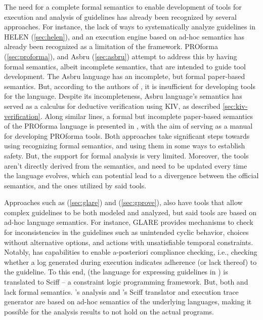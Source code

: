 The need for a complete formal semantics to enable development of tools for
execution and analysis of guidelines has already been recognized by several
approaches. For instance, the lack of ways to systematically analyze guidelines
in HELEN (\autoref{sec:helen}), and an execution engine based on ad-hoc
semantics has already been recognized as a limitation of the framework.
 PROforma (\autoref{sec:proforma}), and
Asbru (\autoref{sec:asbru}) attempt to address this by having formal
semantics, albeit incomplete semantics, that are intended to guide tool
development. The Asbru language has an incomplete, but formal
\SOS{} paper-based semantics. But, according to the authors of
\cite{SuttonAMIA03}, it is insufficient for developing tools for the language.
Despite its incompleteness, Asbru language's semantics has served as a calculus for deductive verification
using KIV, as described \autoref{sec:kiv-verification}.
Along similar lines, a formal but incomplete paper-based semantics
of the PROforma language is
presented in \cite{SuttonAMIA03}, with the aim of serving as a manual for
developing PROforma tools. Both approaches take significant steps towards using
recognizing formal semantics, and using them in some ways
to establish \CDSS{} safety. But, the support for formal analysis is very
limited. Moreover, the tools aren't directly derived
from the semantics, and need to be updated every time the language evolves,
which can potential lead to a divergence between the official semantics, and
the ones utilized by said tools.

Approaches such as \GLARE{} (\autoref{sec:glare}) and \GPROVE{} (\autoref{sec:gprove}), also have tools that allow complex guidelines to
be both modeled and analyzed, but said tools are based on ad-hoc language
semantics. For instance, GLARE{} provides mechanisms to check
for inconsistencies in the guidelines such as unintended cyclic
behavior, choices without alternative options, and actions
with unsatisfiable temporal constraints. Notably, \GPROVE{}
has capabilities to enable a-posteriori compliance checking, i.e., checking whether a log
generated during execution indicates adherence (or lack thereof) to the guideline.
To this end, \GOSPEL{} (the language for expressing guidelines in \GPROVE{})
is translated to Sciff -- a constraint logic programming framework.
But, both \GLARE{} and \GPROVE{} lack formal semantics. \GLARE{}'s analysis
and \GPROVE{}'s Sciff translator and execution trace generator are based on
ad-hoc semantics of the underlying languages, making it possible for the
analysis results to not hold on the actual programs.

